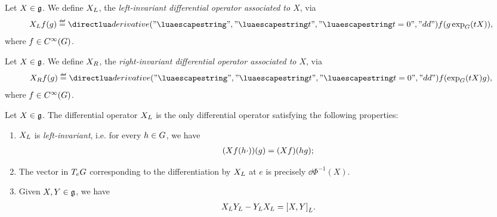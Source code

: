 \begin{definition}
\label{definition:left-invariant_differential_operator}
    Let $X \in \mathfrak{g}$.
    We define ${X}_L$, the \emph{left-invariant differential operator associated to $X$}, via
    \begin{align*}
        \LeftDifferentialOperatorFirstOrder{X} f(g)
            \defeq \D*{t}<t = 0> f(g \exp_\Group(t X)),
    \end{align*}
    where $f \in {C^\infty(G)}$.
\end{definition}

\begin{definition}
\label{definition:right-invariant_differential_operator}
    Let $X \in \mathfrak{g}$.
    We define ${X}_R$, the \emph{right-invariant differential operator associated to $X$}, via
    \begin{align*}
        \RightDifferentialOperatorFirstOrder{X} f(g)
            \defeq \D*{t}<t = 0> f(\exp_\Group(t X) g),
    \end{align*}
    where $f \in {C^\infty(G)}$.
\end{definition}

\begin{proposition}
    Let $X \in \mathfrak{g}$.
    The differential operator ${X}_L$ is the only differential operator satisfying the following properties:
    \begin{enumerate}
        \item ${X}_L$ is \emph{left-invariant},
            i.e. for every $h \in G$, we have
            \begin{align*}
                (X f(h \cdot))(g) = (X f)(h g);
            \end{align*}
        \item The vector in $T_e G$ corresponding to the differentiation by ${X}_L$ at $e$ is precisely $\dd \Phi^{-1}(X)$.
        \item Given $X, Y \in \mathfrak{g}$, we have
            \begin{align*}
                {X}_L {Y}_L - {Y}_L {X}_L
                = {[X, Y]}_L.
            \end{align*}
    \end{enumerate}
\end{proposition}

